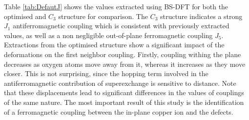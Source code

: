 \documentclass[10pt]{report}
\numberwithin{equation}{section}
\begin{document}
Table \ref{tab:DefautJ} shows the values extracted using BS-DFT for both the optimised and $C_3$ structure for comparison.
The $C_3$ structure indicates a strong $J_1$ antiferromagnetic coupling which is consistent with previously extracted values, as well as a non negligible out-of-plane ferromagnetic coupling $J_5$. 
Extractions from the optimised structure show a significant impact of the deformations on the first neighbor coupling.
Firstly, coupling withing the plane decreases as oxygen atoms move away from it, whereas it increases as they move closer. 
This is not surprising, since the hopping term involved in the antiferromagnetic contribution of superexchange is sensitive to distance.
Note that these displacements lead to significant differences in the values of couplings of the same nature.
The most important result of this study is the identification of a ferromagnetic coupling between the in-plane copper ion and the defects.







\end{document}
